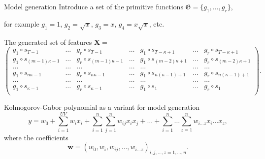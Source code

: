 \documentclass{beamer}
\begin{document}
\begin{frame}{Model generation}
%
Introduce a set of the primitive functions $\mathfrak{G}=\{g_1,\ldots,g_r\}$, \par
for example $g_1=1$, $g_2=\sqrt{x}$, $g_3=x$, $g_4=x\sqrt{x}$, etc.

\vspace{0.7cm}
The generated set of features $\mathbf{X}=$
{\footnotesize
$$
\left(%
\begin{array}{lll|l|lll}%
g_1\circ s_{T-1}    & \ldots & g_r\circ s_{T-1}        & \ldots & g_1\circ s_{T-\kappa +1} & \ldots   & g_r\circ s_{T-\kappa +1}\\
\hline
g_1\circ s_{(m-1)\kappa -1}& \ldots & g_r\circ s_{(m-1)\kappa -1}   & \ldots & g_1\circ s_{(m-2)\kappa +1} & \ldots & g_r\circ s_{(m-2)\kappa +1} \\
\ldots      & \ldots & \ldots        & \ldots & \ldots  & \ldots      & \ldots\\
g_1\circ s_{n\kappa -1}    & \ldots & g_r\circ s_{n\kappa -1}       & \ldots & g_1\circ s_{n(\kappa -1)+1} & \ldots & g_r\circ s_{n(\kappa -1)+1}\\
\ldots      & \ldots & \ldots        & \ldots & \ldots  & \ldots      & \ldots\\
g_1\circ s_{\kappa -1}     & \ldots & g_r\circ s_{\kappa -1}        & \ldots & g_1\circ s_1  & \ldots         & g_r\circ s_1\\
\end{array}%
\right).
$$
}

Kolmogorov-Gabor polynomial as a variant for model generation
$$
y=w_0+\sum_{i=1}^{UV}w_ix_i + \sum_{i=1}^{n}\sum_{j=1}^{n}w_{ij}x_ix_j +\dots + \sum_{i=1}^{n}\ldots\sum_{z=1}^{n}w_{i\ldots z}x_i\ldots x_z,
$$
where the coefficients
$$
\mathbf{w}= (w_0,w_i,w_{ij},\ldots,w_{i\ldots z})_{i,j,\ldots,z=1,\ldots,n}.
$$

\end{frame}
\end{document}
